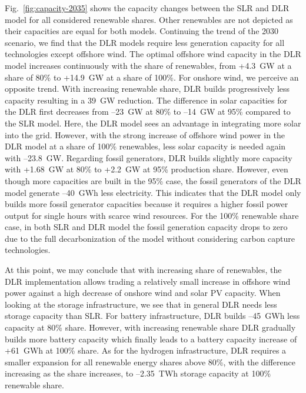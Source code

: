 \documentclass[preprint,12pt]{elsarticle}
\begin{document}
Fig.~\ref{fig:capacity-2035} shows the capacity changes between the SLR and DLR model for all considered renewable shares. Other renewables are not depicted as their capacities are equal for both models.
Continuing the trend of the 2030 scenario, we find that the DLR models require less generation capacity for all technologies except offshore wind. The optimal offshore wind capacity in the DLR model increases continuously with the share of renewables, from +4.3~GW at a share of 80\% to +14.9~GW at a share of 100\%.
For onshore wind, we perceive an opposite trend. With increasing renewable share, DLR builds progressively less capacity resulting in a 39~GW reduction.
The difference in solar capacities for the DLR first decreases from --23~GW at 80\% to --14~GW at 95\% compared to the SLR model. Here, the DLR model sees an advantage in integrating more solar into the grid. However, with the strong increase of offshore wind power in the DLR model at a share of 100\% renewables, less solar capacity is needed again with --23.8~GW.
Regarding fossil generators, DLR builds slightly more capacity with +1.68~GW at 80\% to +2.2~GW at 95\% production share.
However, even though more capacities are built in the 95\% case, the fossil generators of the DLR model generate --40~GWh less electricity.
This indicates that the DLR model only builds more fossil generator capacities because it requires a higher fossil power output for single hours with scarce wind resources.
For the 100\% renewable share case, in both SLR and DLR model the fossil generation capacity drops to zero due to the full decarbonization of the model without considering carbon capture technologies.


At this point, we may conclude that with increasing share of renewables, the DLR implementation allows trading a relatively small increase in offshore wind power against a high decrease of onshore wind and solar PV capacity.
When looking at the storage infrastructure, we see that in general DLR needs less storage capacity than SLR. For battery infrastructure, DLR builds --45~GWh less capacity at 80\% share. However, with increasing renewable share DLR gradually builds more battery capacity which finally leads to a battery capacity increase of +61~GWh at 100\% share.
As for the hydrogen infrastructure, DLR requires a smaller expansion for all renewable energy shares above 80\%, with the difference increasing as the share increases, to --2.35~TWh storage capacity at 100\% renewable share.
\end{document}
